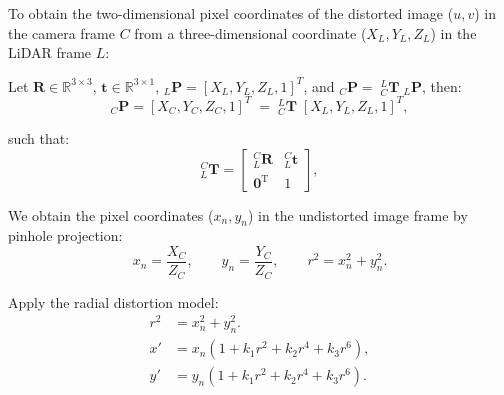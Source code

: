 \documentclass{erauthesis}
\begin{document}
To obtain the two-dimensional pixel coordinates of the distorted image ($u, v$) in the camera frame $C$ from a three-dimensional coordinate ($X_{L}, Y_L, Z_L$) in the LiDAR frame $L$:

Let $\mathbf{R}\in \mathbb{R}^{3\times3}$, $\mathbf{t}\in \mathbb{R}^{3\times1}$, $_L\mathbf{P} = [X_L, Y_L, Z_L, 1]^T$,  and $_C\mathbf{P} = \;_{C}^{L}\mathbf{T} \; _L\mathbf{P}$, then:
\begin{equation*}
_C\mathbf{P} = [X_C, Y_C, Z_C, 1]^T \;= \; _{C}^{L}\mathbf{T} \;[X_L, Y_L, Z_L, 1]^T,
\end{equation*}

such that:
\begin{equation*}
    _{L}^{C}\mathbf{T} =
    \begin{bmatrix}
        _{L}^{C}\mathbf{R} & _{L}^{C}\mathbf{t} \\
        \mathbf{0}^\mathrm{T} & 1
    \end{bmatrix},
\end{equation*}

We obtain the pixel coordinates ($x_n, y_n$) in the undistorted image frame by pinhole projection:
\begin{equation*}
x_n = \frac{X_C}{Z_C}, \qquad
y_n = \frac{Y_C}{Z_C}, \qquad
r^2 = x_n^2 + y_n^2 .
\label{eq:normalized_coords}
\end{equation*}

Apply the radial distortion model:
\begin{align*}
r^2 & = x_n^2 + y_n^2 .\\
x' & = x_n\!\left(1 + k_1 r^2 + k_2 r^4 + k_3 r^6\right), \\
y' & = y_n\!\left(1 + k_1 r^2 + k_2 r^4 + k_3 r^6\right).
\label{eq:radial_distortion_apply}
\end{align*}
\end{document}
